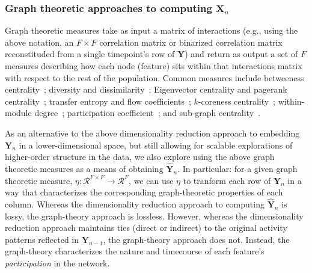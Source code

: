 \documentclass[english]{article}
\begin{document}
\subsubsection*{Graph theoretic approaches to computing
  $\mathbf{X}_n$}

Graph theoretic measures take as input a matrix of interactions (e.g.,
using the above notation, an $F \times F$ correlation matrix or
binarized correlation matrix reconstituded from a single timepoint's
row of $\mathbf{Y}$) and return as output a set of $F$ measures
describing how each node (feature) sits within that interactions
matrix with respect to the rest of the population.  Common measures
include betweeness centrality~\citep[the proportion of shortest paths
between each pair of nodes in the population that involves the given
node in question; e.g., ][]{Newm05, OpsaEtal10, Bart04, GeisEtal08,
  Free77}; diversity and dissimilarity~\citep[characterizations of how
differently connected a given node is from others in the population;
e.g., ][]{Rao82, Lin09, RicoSzei06}; Eigenvector centrality and
pagerank centrality~\citep[measures of how influential a given node is
within the broader network; e.g., ][]{Newm08, Bona07, LohmEtal10,
  HaluEtal13}; transfer entropy and flow coefficients~\citep[a measure
of how much information is flowing from a given node to other nodes in
the network; e.g., ][]{HoneEtal07, Schr00}; $k$-coreness
centrality~\citep[a measure of the connectivity of a node within its
local sub-graph; e.g., ][]{AlvaEtal05, ChriFowl10}; within-module
degree~\citep[a measure of how many connections a node has to its
close neighbors in the network; e.g., ][]{RubiSpor10}; participation
coefficient~\citep[a measure of the diversity of a node's connections
to different sub-graphs in the network; e.g., ][]{RubiSpor10}; and
sub-graph centrality~\citep[a measure of a node's participation in all
of the network's sub-graphs; e.g., ][]{EstrRodr05}.

As an alternative to the above dimensionality reduction approach to
embedding $\mathbf{Y}_n$ in a lower-dimensional space, but still
allowing for scalable explorations of higher-order structure in the
data, we also explore using the above graph theoretic measures as a
means of obtaining $\hat{\mathbf{Y}}_n$.  In particular: for a given
graph theoretic measure, $\eta: \mathcal{R}^{F \times F} \rightarrow
\mathcal{R}^F$, we can use $\eta$ to tranform each row of
$\mathbf{Y}_n$ in a way that characterizes the corresponding
graph-theoretic properties of each column.  Whereas the dimensionality
reduction approach to computing $\hat{\mathbf{Y}}_n$ is lossy,
the graph-theory approach is lossless.  However, whereas the
dimensionality reduction approach maintains ties (direct or indirect)
to the original activity patterns reflected in $\mathbf{Y}_{n-1}$, the
graph-theory approach does not.  Instead, the graph-theory
characterizes the nature and timecourse of each feature's
\textit{participation} in the network.
\end{document}
